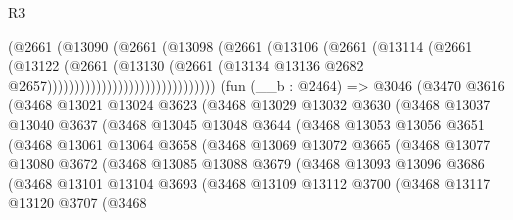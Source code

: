 \begin{lexlean}{R3}
\begin{coremodule}
                                      (@2661
                                        (@13090
                                          (@2661
                                            (@13098
                                              (@2661
                                                (@13106
                                                  (@2661
                                                    (@13114
                                                      (@2661
                                                        (@13122
                                                          (@2661
                                                            (@13130
                                                              (@2661
                                                                (@13134
                                                                  @13136
                                                                  @2682
                                                                  @2657)))))))))))))))))))))))))))))))
    (fun (__b : @2464) =>
    @3046
      (@3470
        @3616
        (@3468
          @13021
          @13024
          @3623
          (@3468
            @13029
            @13032
            @3630
            (@3468
              @13037
              @13040
              @3637
              (@3468
                @13045
                @13048
                @3644
                (@3468
                  @13053
                  @13056
                  @3651
                  (@3468
                    @13061
                    @13064
                    @3658
                    (@3468
                      @13069
                      @13072
                      @3665
                      (@3468
                        @13077
                        @13080
                        @3672
                        (@3468
                          @13085
                          @13088
                          @3679
                          (@3468
                            @13093
                            @13096
                            @3686
                            (@3468
                              @13101
                              @13104
                              @3693
                              (@3468
                                @13109
                                @13112
                                @3700
                                (@3468
                                  @13117
                                  @13120
                                  @3707
                                  (@3468

\end{coremodule}
\end{lexlean}
